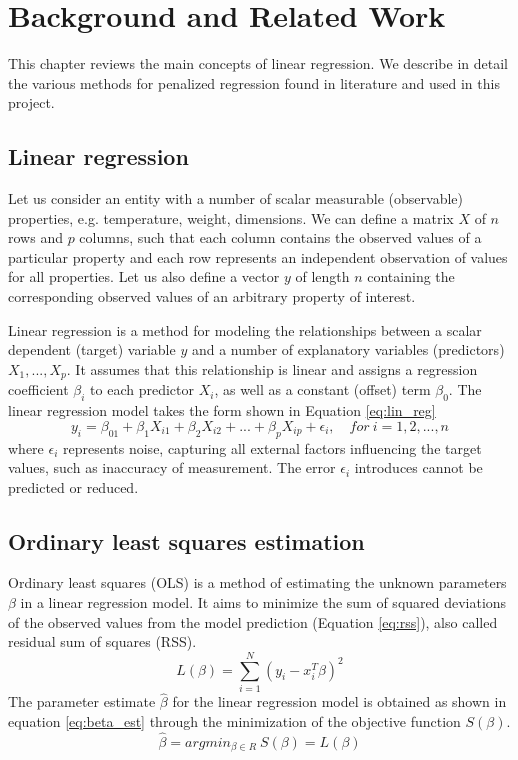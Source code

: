 \chapter{Background and Related Work} \label{background}
This chapter reviews the main concepts of linear regression. We describe in detail the various methods for penalized regression found in literature and used in this project.


\section{Linear regression}
Let us consider an entity with a number of scalar measurable (observable) properties, e.g. temperature, weight, dimensions. We can define a matrix $X$ of $n$ rows and $p$ columns, such that each column contains the observed values of a particular property and each row represents an independent observation of values for all properties. Let us also define a vector $y$ of length $n$ containing the corresponding observed values of an arbitrary property of interest.

Linear regression is a method for modeling the relationships between a scalar dependent (target) variable $y$ and a number of explanatory variables (predictors) $X_1,...,X_p$. It assumes that this relationship is linear and assigns a regression coefficient $\beta_i$ to each predictor $X_i$, as well as a constant (offset) term $\beta_0$. The linear regression model takes the form shown in Equation \ref{eq:lin_reg}
\begin{equation} \label{eq:lin_reg}
y_i = \beta_01+\beta_1X_{i1}+\beta_2X_{i2}+...+\beta_pX_{ip}+\epsilon_i, \quad for\ i=1,2,...,n
\end{equation}
where $\epsilon_i$ represents noise, capturing all external factors influencing the target values, such as inaccuracy of measurement. The error $\epsilon_i$ introduces cannot be predicted or reduced.


\section{Ordinary least squares estimation} \label{sec:olse}
Ordinary least squares (OLS) is a method of estimating the unknown parameters $\beta$ in a linear regression model. It aims to minimize the sum of squared deviations of the observed values from the model prediction (Equation \ref{eq:rss}), also called residual sum of squares (RSS).
\begin{equation} \label{eq:rss}
L(\beta) = \sum_{i=1}^{N} (y_i - x_i^T\beta)^2
\end{equation}
The parameter estimate $\hat{\beta}$ for the linear regression model is obtained as shown in equation \ref{eq:beta_est} through the minimization of the objective function $S(\beta)$.
\begin{equation} \label{eq:beta_est}
\hat{\beta} = argmin_{\beta \in R}\ S(\beta) = L(\beta)
\end{equation}


